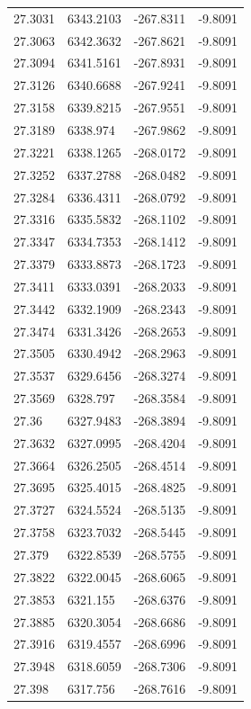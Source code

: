 \begin{table}[H]
\begin{tabular}{llll}
27.3031 & 6343.2103 & -267.8311 & -9.8091 \\
27.3063 & 6342.3632 & -267.8621 & -9.8091 \\
27.3094 & 6341.5161 & -267.8931 & -9.8091 \\
27.3126 & 6340.6688 & -267.9241 & -9.8091 \\
27.3158 & 6339.8215 & -267.9551 & -9.8091 \\
27.3189 & 6338.974 & -267.9862 & -9.8091 \\
27.3221 & 6338.1265 & -268.0172 & -9.8091 \\
27.3252 & 6337.2788 & -268.0482 & -9.8091 \\
27.3284 & 6336.4311 & -268.0792 & -9.8091 \\
27.3316 & 6335.5832 & -268.1102 & -9.8091 \\
27.3347 & 6334.7353 & -268.1412 & -9.8091 \\
27.3379 & 6333.8873 & -268.1723 & -9.8091 \\
27.3411 & 6333.0391 & -268.2033 & -9.8091 \\
27.3442 & 6332.1909 & -268.2343 & -9.8091 \\
27.3474 & 6331.3426 & -268.2653 & -9.8091 \\
27.3505 & 6330.4942 & -268.2963 & -9.8091 \\
27.3537 & 6329.6456 & -268.3274 & -9.8091 \\
27.3569 & 6328.797 & -268.3584 & -9.8091 \\
27.36 & 6327.9483 & -268.3894 & -9.8091 \\
27.3632 & 6327.0995 & -268.4204 & -9.8091 \\
27.3664 & 6326.2505 & -268.4514 & -9.8091 \\
27.3695 & 6325.4015 & -268.4825 & -9.8091 \\
27.3727 & 6324.5524 & -268.5135 & -9.8091 \\
27.3758 & 6323.7032 & -268.5445 & -9.8091 \\
27.379 & 6322.8539 & -268.5755 & -9.8091 \\
27.3822 & 6322.0045 & -268.6065 & -9.8091 \\
27.3853 & 6321.155 & -268.6376 & -9.8091 \\
27.3885 & 6320.3054 & -268.6686 & -9.8091 \\
27.3916 & 6319.4557 & -268.6996 & -9.8091 \\
27.3948 & 6318.6059 & -268.7306 & -9.8091 \\
27.398 & 6317.756 & -268.7616 & -9.8091 \\

\end{tabular}
\end{table}
